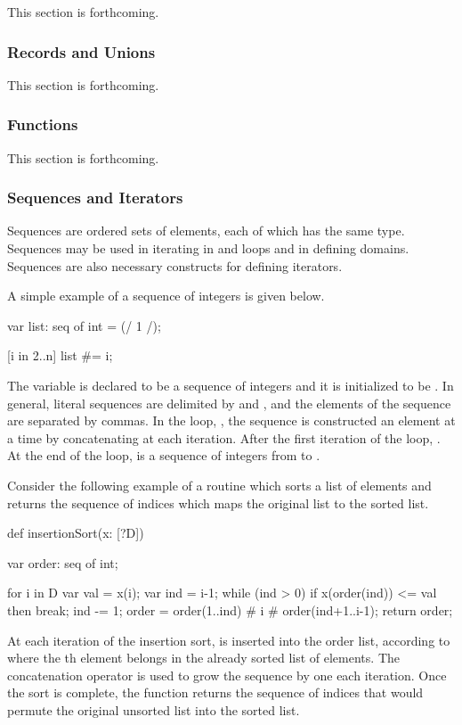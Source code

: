 This section is forthcoming.

\subsubsection{Records and Unions}
\label{Intro_Records_and_Unions}

This section is forthcoming.

\subsubsection{Functions}
\label{Intro_Functions}

This section is forthcoming.

\subsubsection{Sequences and Iterators}
\label{Sequences_and_Iterators}

Sequences are ordered sets of elements, each of which has the same type.
Sequences may be used in iterating in  and  loops and 
in defining domains.  Sequences are also necessary constructs for defining iterators.    

A simple example of a sequence of integers is given below.
\begin{chapel}
var list: seq of int = (/ 1 /);

[i in 2..n] list #= i;
\end{chapel}
The variable  is declared to be a sequence of integers and it is 
initialized to be . In general, literal sequences are delimited by 
\chpl{(/} and \chpl{/)}, and the elements of the sequence are separated by commas.
In the loop, \chpl{[i in 2..n]}, the sequence  is constructed an element 
at a time by concatenating  at each iteration. After the first iteration 
of the loop, . At the end of the loop,
 is a sequence of integers from  to .

Consider the following example of a routine which sorts a list 
of elements and returns the sequence of indices which maps the original
list to the sorted list.
\begin{example}
\begin{chapel}
def insertionSort(x: [?D]) {
  var order: seq of int;

  for i in D {
    var val = x(i);
    var ind = i-1;
    while (ind > 0) {
      if x(order(ind)) <= val then break;
      ind -= 1;
    }
    order = order(1..ind) # i # order(ind+1..i-1);
  }
  return order;
}
\end{chapel}
\end{example}
At each iteration of the insertion sort,  is inserted into the
order list, according to where the th element belongs in
the already sorted list of  elements.  The concatenation operator 
\chpl{#} is used to grow the sequence by one each iteration.  Once the sort is
complete, the function returns the sequence of indices that would permute
the original unsorted list into the sorted list.

